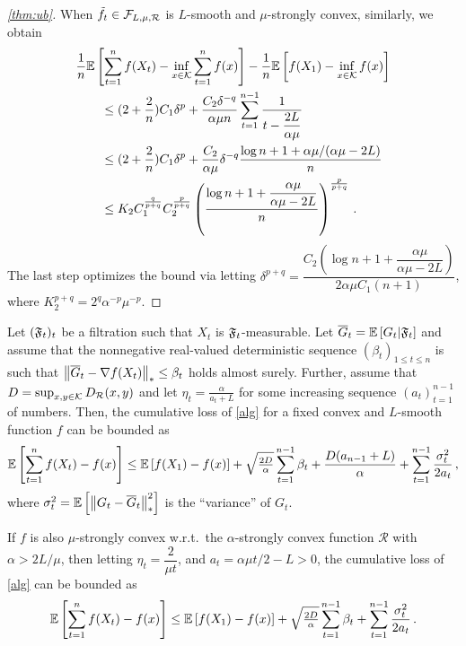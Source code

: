 \begin{proof}[\cref{thm:ub}]
 When $\tilde{f}_t \in \mathcal{F}_{L,\mu, \mathcal{R}}$ is $L$-smooth and $\mu$-strongly convex, similarly, we obtain
 \begin{align*}
 \MoveEqLeft
\frac{1}{n} \EE{ \sum_{t=1}^n f( X_t) - \inf_{x \in \cK} \sum_{t=1}^n f(x)} -\frac{1}{n}\EE{f(X_1)-\inf_{x \in \cK}f(x)}\\
&\le (2+\dfrac{2}{n})C_1\delta^p+\dfrac{C_2 \delta^{-q}}{\alpha \mu n} \sum_{t=1}^{n-1}\dfrac{1}{t-\dfrac{2L}{\alpha \mu}}\\
&\le (2+\dfrac{2}{n})C_1\delta^p+\dfrac{C_2 }{\alpha \mu}\delta^{-q} \dfrac{\log n+1+\alpha \mu/(\alpha \mu-2L)}{n}\\
&\le K_2C_1^{\frac{q}{p+q}}C_2^{\frac{p}{p+q}} \left( \frac{\log n+1+\dfrac{\alpha \mu}{\alpha \mu -2L}}{n} \right)^{\frac{p}{p+q}}\,.
 \end{align*}
The last step optimizes the bound via letting
$\delta^{p+q} =  \dfrac{C_2\left( \log n+1+\dfrac{\alpha \mu}{\alpha \mu -2L}\right)}{2\alpha \mu C_1 (n+1)}$,
where
$K_2^{p+q}=2^{q}\alpha^{-p}\mu^{-p}$.
\end{proof}

\begin{lemma}
\label{lem:ub}
Let $({\mathfrak{F}}_t)_{t}$ be a filtration such that $X_t$ is ${{\mathfrak{F}}}_t$-measurable.
Let $\overline G_t = \mathbb{E}\left[G_t|{{\mathfrak{F}}}_t\right]$
and assume that the nonnegative real-valued deterministic sequence $(\beta_t)_{1\le t\le n}$ is such that
$\left\|\overline G_t - \nabla {f}(X_t)\right\|_* \le \beta_t$ holds almost surely.
Further, assume that $D=\sup_{x,y\in \mathcal{K}} D_{\mathcal{R}}(x,y)$ and let $\eta_t = \frac{\alpha}{a_t+L}$ for some increasing
sequence $(a_t)_{t=1}^{n-1}$ of numbers. Then, the cumulative loss of \cref{alg} for a fixed convex and $L$-smooth  function $f$ can be bounded as
\begin{align*}
\mathbb{E}\left[ \sum_{t=1}^n {f}(X_t) - {f}(x) \right]
\le 	 \mathbb{E}\left[{f}(X_1)-{f}(x)\right]+
  \sqrt{\tfrac{2D}{\alpha}} \sum_{t=1}^{n-1} \beta_t
 +\frac{D(a_{n-1}+L)}{\alpha} +
	  \sum_{t=1}^{n-1}\frac{\sigma_t^2}{2a_t}\,,
\end{align*}
where $\sigma_t^2 = \mathbb{E}\left[ \left\|G_t-\overline G_t\right\|_*^2\right]$ is the ``variance'' of $G_t$.

If ${{f}}$ is also $\mu$-strongly convex w.r.t.\  the $\alpha$-strongly convex function $\mathcal{R}$ with $\alpha > 2L/\mu$, then letting $\eta_t = \dfrac{2}{\mu t}$, and $a_t = \alpha \mu t/2-L > 0$, the cumulative loss of  \cref{alg} can be bounded as
\begin{align*}
 \mathbb{E}\left[ \sum_{t=1}^n {f}(X_t) - {f}(x) \right]
\le 	 \mathbb{E}\left[{f}(X_1)-{f}(x)\right]+
 \sqrt{\tfrac{2D}{\alpha}} \sum_{t=1}^{n-1} \beta_t
 +\sum_{t=1}^{n-1}\frac{\sigma_t^2}{2a_t}\,.
\end{align*}
\end{lemma}


